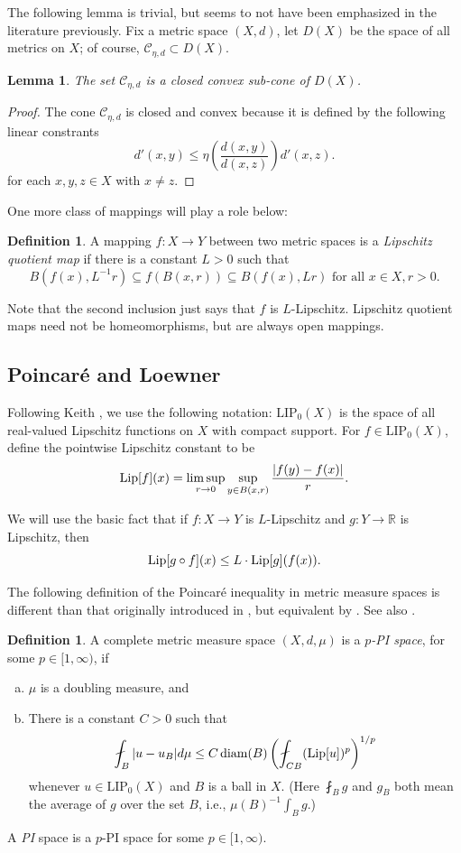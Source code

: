\documentclass{amsart}
\DeclareMathOperator{\diam}{diam}
\theoremstyle{plain}
\newtheorem{lemma}[theorem]{Lemma}
\theoremstyle{definition}
\newtheorem{definition}[theorem]{Definition}
\numberwithin{equation}{section}
\numberwithin{theorem}{section}
\newcommand{\RR}{\mathbb{R}}
\newcommand{\cC}{\mathcal{C}}
\newcommand{\Lip}{\textnormal{Lip}}
\begin{document}
The following lemma is trivial, but seems to not have been emphasized in the literature previously. Fix a metric space $(X,d)$, let $D(X)$ be the space of all metrics on $X$; of course, $\cC_{\eta,d} \subset D(X)$. 
\begin{lemma}\label{lem:convexcone}
    The set $\cC_{\eta,d}$ is a closed convex sub-cone of $D(X)$.
\end{lemma}
\begin{proof}
    The cone $\cC_{\eta,d}$ is closed and convex because it is defined by the following linear constrants
    \[
    d'(x,y)\leq \eta \left(\frac{d(x,y)}{d(x,z)}\right) d'(x,z).
    \]
    for each $x,y,z\in X$ with $x\neq z$. 
\end{proof}

One more class of mappings will play a role below:
\begin{definition}
A mapping $f\colon X\rightarrow Y$ between two metric spaces is a \emph{Lipschitz quotient map} if there is a constant $L>0$ such that
$$ B(f(x), L^{-1}r) \subseteq f(B(x,r)) \subseteq B(f(x),Lr) \text{ for all } x\in X, r>0.$$
\end{definition}
Note that the second inclusion just says that $f$ is $L$-Lipschitz. Lipschitz quotient maps need not be homeomorphisms, but are always open mappings.

\subsection{Poincar\'e and Loewner}

Following Keith \cite{Keith}, we use the following notation: $\text{LIP}_0(X)$ is the space of all real-valued Lipschitz functions on $X$ with compact support. For $f\in \text{LIP}_0(X)$, define the pointwise Lipschitz constant to be 
$$ \Lip[f](x) = \limsup_{r\rightarrow 0} \sup_{y\in B(x,r)} \frac{|f(y)-f(x)|}{r}.$$


We will use the basic fact that if $f\colon X\rightarrow Y$ is $L$-Lipschitz and $g\colon Y \rightarrow \RR$ is Lipschitz, then
\begin{equation}\label{eq:Lip}
 \Lip[g\circ f](x) \leq L \cdot \Lip[g](f(x)).
\end{equation}


The following definition of the Poincar\'e inequality in metric measure spaces is different than that originally introduced in \cite{HK}, but equivalent by \cite{Keith}. See also \cite{KRajala}.
\begin{definition}
A complete metric measure space $(X,d,\mu)$ is a \emph{$p$-PI space}, for some $p\in [1,\infty)$, if
\begin{enumerate}[(a)]
\item $\mu$ is a doubling measure, and
\item There is a constant $C>0$ such that
$$ \fint_B |u-u_B| d\mu \leq C \diam(B) \left( \fint_{CB} (\Lip[u])^p\right)^{1/p}$$
whenever $u\in \text{LIP}_0(X)$ and $B$ is a ball in $X$. (Here $\fint_B g$ and $g_B$ both mean the average of $g$ over the set $B$, i.e., $\mu(B)^{-1}\int_B g$.)
\end{enumerate}
A \emph{PI} space is a $p$-PI space for some $p\in[1,\infty)$.

\end{definition}
\end{document}
